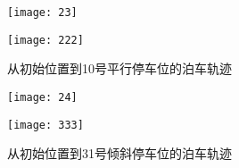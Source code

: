 \documentclass{MathorCupmodeling}
\begin{document}
\begin{enumerate}
\begin{enumerate}

			\begin{figure}[H]
				\centering
				\begin{minipage}[c]{0.4\textwidth}
					\centering
					\texttt{[image: 23]}
					\label{fig:sample-figure-a}
				\end{minipage}
				\begin{minipage}[c]{0.4\textwidth}
					\centering
					\texttt{[image: 222]}
					\label{fig:sample-figure-c}
				\end{minipage}
				\caption{从初始位置到10号平行停车位的泊车轨迹}
				\label{fig:sample-figure}
			\end{figure}



			\begin{figure}[H]
				\centering
				\begin{minipage}[c]{0.4\textwidth}
					\centering
					\texttt{[image: 24]}
					\label{fig:sample-figure-a}
				\end{minipage}
				\begin{minipage}[c]{0.4\textwidth}
					\centering
					\texttt{[image: 333]}
					\label{fig:sample-figure-c}
				\end{minipage}
				\caption{从初始位置到31号倾斜停车位的泊车轨迹}
				\label{fig:sample-figure}
			\end{figure}


\end{enumerate}
\end{enumerate}
\end{document}
